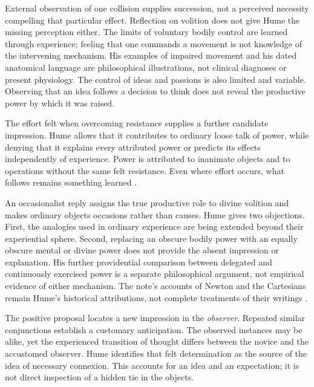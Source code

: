 External observation of one collision supplies succession, not a
perceived necessity compelling that particular effect. Reflection on
volition does not give Hume the missing perception either. The limits
of voluntary bodily control are learned through experience; feeling
that one commands a movement is not knowledge of the intervening
mechanism. His examples of impaired movement and his dated anatomical
language are philosophical illustrations, not clinical diagnoses or
present physiology. The control of ideas and passions is also limited
and variable. Observing that an idea follows a decision to think does
not reveal the productive power by which it was raised.

The effort felt when overcoming resistance supplies a further candidate
impression. Hume allows that it contributes to ordinary loose talk of
power, while denying that it explains every attributed power or predicts
its effects independently of experience. Power is attributed to
inanimate objects and to operations without the same felt resistance.
Even where effort occurs, what follows remains something learned
\parencite[E~7.6--7.20, 7.15n13]{Hume1777EnquiryHTO}.

An occasionalist reply assigns the true productive role to divine
volition and makes ordinary objects occasions rather than causes.
Hume gives two objections. First, the analogies used in ordinary
experience are being extended beyond their experiential sphere.
Second, replacing an obscure bodily power with an equally obscure
mental or divine power does not provide the absent impression or
explanation. His further providential comparison between delegated
and continuously exercised power is a separate philosophical argument,
not empirical evidence of either mechanism. The note's accounts of
Newton and the Cartesians remain Hume's historical attributions, not
complete treatments of their writings
\parencite[E~7.21--7.25, 7.25n16]{Hume1777EnquiryHTO}.

The positive proposal locates a new impression in the \emph{observer}.
Repeated similar conjunctions establish a customary anticipation.
The observed instances may be alike, yet the experienced transition
of thought differs between the novice and the accustomed observer.
Hume identifies that felt determination as the source of the idea
of necessary connexion. This accounts for an idea and an expectation;
it is not direct inspection of a hidden tie in the objects.


